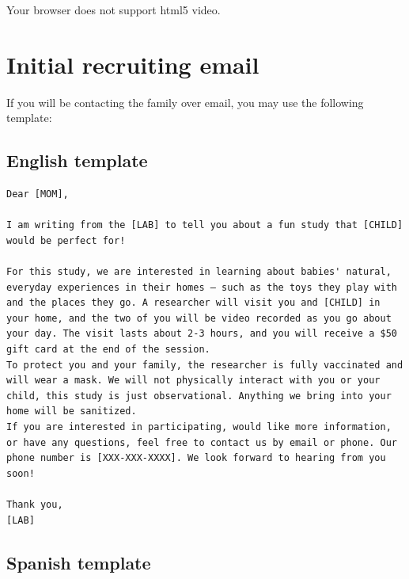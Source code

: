 \documentclass[
  12pt,
]{book}
\begin{document}
Your browser does not support html5 video.

\hypertarget{initial-recruiting-email}{%
\section{Initial recruiting email}\label{initial-recruiting-email}}

If you will be contacting the family over email, you may use the following template:

\hypertarget{english-template}{%
\subsection*{English template}\label{english-template}}

\begin{verbatim}
Dear [MOM],
  
I am writing from the [LAB] to tell you about a fun study that [CHILD] would be perfect for!

For this study, we are interested in learning about babies' natural, everyday experiences in their homes — such as the toys they play with and the places they go. A researcher will visit you and [CHILD] in your home, and the two of you will be video recorded as you go about your day. The visit lasts about 2-3 hours, and you will receive a $50 gift card at the end of the session.
To protect you and your family, the researcher is fully vaccinated and will wear a mask. We will not physically interact with you or your child, this study is just observational. Anything we bring into your home will be sanitized.
If you are interested in participating, would like more information, or have any questions, feel free to contact us by email or phone. Our phone number is [XXX-XXX-XXXX]. We look forward to hearing from you soon!

Thank you, 
[LAB]
\end{verbatim}

\hypertarget{spanish-template}{%
\subsection*{Spanish template}\label{spanish-template}}
\end{document}
